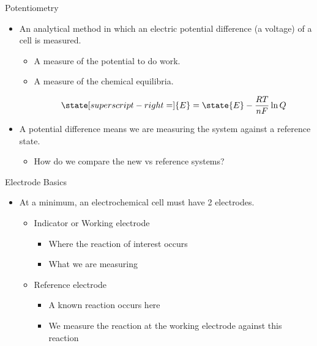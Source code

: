 \documentclass[notes=show]{beamer}
\begin{document}
\begin{frame}{Potentiometry}
	\begin{itemize}[<+->]
		\item An analytical method in which an electric potential
			difference (a voltage) of a cell is measured.
			\begin{itemize}
				\item A measure of the potential to do work.
				\item A measure of the \alert{chemical
					equilibria}.

					\begin{equation*}
						\state[superscript-right=]{E} =
						\state{E} - \frac{RT}{nF} \ln Q
					\end{equation*}
			\end{itemize}
		\item A potential \alert{difference} means we are measuring the
			system against a \alert{reference} state.
			\begin{itemize}
				\item How do we compare the new vs reference
					systems?
			\end{itemize}
	\end{itemize}
\end{frame}

\begin{frame}{Electrode Basics}
	\begin{itemize}
		\item At a \alert{minimum}, an electrochemical cell must have
			\alert{2} electrodes.
			\begin{itemize}
				\item Indicator or Working electrode
					\begin{itemize}
						\item Where the reaction of
							interest occurs
						\item What we are measuring
					\end{itemize}
				\item Reference electrode
					\begin{itemize}
						\item A known reaction occurs
							here
						\item We measure the reaction at
							the working electrode
							\alert{against} this
							reaction
					\end{itemize}
			\end{itemize}
	\end{itemize}
\end{frame}
\end{document}
